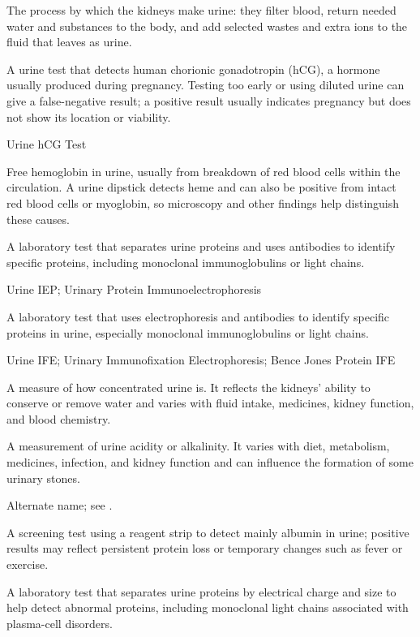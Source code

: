  The process by which the kidneys make urine: they filter blood, return needed water and substances to the body, and add selected wastes and extra ions to the fluid that leaves as urine.

 A urine test that detects human chorionic gonadotropin (hCG), a hormone usually produced during pregnancy. Testing too early or using diluted urine can give a false-negative result; a positive result usually indicates pregnancy but does not show its location or viability.

\synonyms
Urine hCG Test

 Free hemoglobin in urine, usually from breakdown of red blood cells within the circulation. A urine dipstick detects heme and can also be positive from intact red blood cells or myoglobin, so microscopy and other findings help distinguish these causes.

 A laboratory test that separates urine proteins and uses antibodies to identify specific proteins, including monoclonal immunoglobulins or light chains.

\synonyms
Urine IEP; Urinary Protein Immunoelectrophoresis

 A laboratory test that uses electrophoresis and antibodies to identify specific proteins in urine, especially monoclonal immunoglobulins or light chains.

\synonyms
Urine IFE; Urinary Immunofixation Electrophoresis; Bence Jones Protein IFE

 A measure of how concentrated urine is. It reflects the kidneys’ ability to conserve or remove water and varies with fluid intake, medicines, kidney function, and blood chemistry.

 A measurement of urine acidity or alkalinity. It varies with diet, metabolism, medicines, infection, and kidney function and can influence the formation of some urinary stones.

 Alternate name; see .

 A screening test using a reagent strip to detect mainly albumin in urine; positive results may reflect persistent protein loss or temporary changes such as fever or exercise.

 A laboratory test that separates urine proteins by electrical charge and size to help detect abnormal proteins, including monoclonal light chains associated with plasma-cell disorders.

